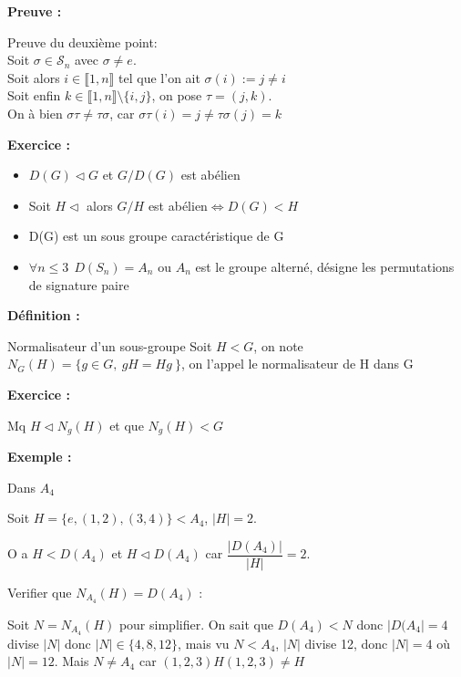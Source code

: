 \documentclass{report}
\newenvironment{definition}[1][]{
    \begin{tcolorbox}[colframe= white]
    \textbf{Définition :} 
    #1 \par
    }
    {\end{tcolorbox}}
\newenvironment{preuve}{\begin{tcolorbox}[colframe= white]
    \textbf{Preuve :}
\par }
    {\end{tcolorbox}}
\newenvironment{exemple}{\begin{tcolorbox}[colframe= white]
    \textbf{Exemple :}
     \par}
    {\end{tcolorbox}}
\newenvironment{exo}{\begin{tcolorbox}[colframe= white]
    \textbf{Exercice :}
    \par}
    {\end{tcolorbox}}
\newcommand{\sn}{\mathcal{S}_{n}}
\begin{document}
\begin{preuve}
    Preuve du deuxième point:\\
    Soit $\sigma \in \sn$ avec $\sigma \neq e$.\\
    Soit alors $i\in \llbracket 1,n \rrbracket$ tel que l'on ait $\sigma(i):=j\neq i$\\
    Soit enfin $k\in \llbracket 1,n \rrbracket \setminus \{i,j\}$, on pose $\tau = (j,k)$.\\
    On à bien $\sigma\tau\neq\tau\sigma$, car $\sigma\tau(i)=j\neq\tau\sigma(j)=k$
\end{preuve}


\begin{exo}
    \begin{itemize}
        \item $D(G)\vartriangleleft G$ et $G/D(G)$ est abélien
        \item Soit $H \vartriangleleft$ alors $G/H$ est abélien$\Leftrightarrow D(G)<H$
        \item D(G) est un sous groupe caractéristique de G
        \item $\forall n \leq3 ~~D(S_{n})=A_{n}$ ou $A_{n}$ est le groupe alterné, désigne les permutations de signature paire
    \end{itemize}
\end{exo}

\begin{definition}{Normalisateur d'un sous-groupe}
Soit $H<G$, on note$N_{G}(H) = \{g\in G , ~gH=Hg~\}$, on l'appel le normalisateur de H dans G
\end{definition}

\begin{exo}
Mq $H\triangleleft N_{g}(H)$ et que $N_{g}(H)<G$
\end{exo}

\begin{exemple}
Dans $A_{4}$ \par
Soit $H =\{ e,(1,2),(3,4) \}<A_{4}$, $|H|=2$.  \par
O a $H<D(A_{4})$ et $H\triangleleft D(A_{4})$ car $\dfrac{|D(A_{4})|}{|H|}=2$.  \par
Verifier que $N_{A_{4}}(H)=D(A_{4})$ :  \par

Soit $N = N_{A_{4}}(H)$ pour simplifier. On sait que $D(A_{4})<N$ donc $|D(A_{4}|=4$ divise $|N|$ donc $|N|\in \{ 4,8,12 \}$, mais vu $N<A_{4}$, $|N|$ divise 12, donc $|N|=4$ où $|N|=12$. Mais $N\neq A_{4}$ car $(1,2,3)H(1,2,3)\neq H$  \par
\end{exemple}
\end{document}
